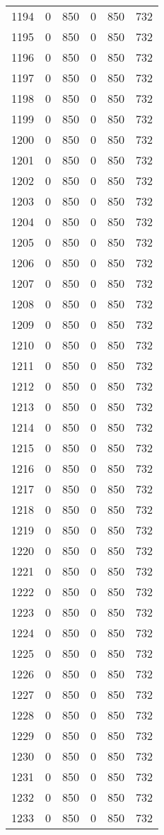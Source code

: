 \documentclass[a4paper]{ctexart}
\begin{document}
\begin{longtable}{p{1cm}|p{2cm}|p{2cm}|p{2cm}|P{2cm}|p{2cm}}
		1194&0&850&0&850&732\\
		1195&0&850&0&850&732\\
		1196&0&850&0&850&732\\
		1197&0&850&0&850&732\\
		1198&0&850&0&850&732\\
		1199&0&850&0&850&732\\
		1200&0&850&0&850&732\\
		1201&0&850&0&850&732\\
		1202&0&850&0&850&732\\
		1203&0&850&0&850&732\\
		1204&0&850&0&850&732\\
		1205&0&850&0&850&732\\
		1206&0&850&0&850&732\\
		1207&0&850&0&850&732\\
		1208&0&850&0&850&732\\
		1209&0&850&0&850&732\\
		1210&0&850&0&850&732\\
		1211&0&850&0&850&732\\
		1212&0&850&0&850&732\\
		1213&0&850&0&850&732\\
		1214&0&850&0&850&732\\
		1215&0&850&0&850&732\\
		1216&0&850&0&850&732\\
		1217&0&850&0&850&732\\
		1218&0&850&0&850&732\\
		1219&0&850&0&850&732\\
		1220&0&850&0&850&732\\
		1221&0&850&0&850&732\\
		1222&0&850&0&850&732\\
		1223&0&850&0&850&732\\
		1224&0&850&0&850&732\\
		1225&0&850&0&850&732\\
		1226&0&850&0&850&732\\
		1227&0&850&0&850&732\\
		1228&0&850&0&850&732\\
		1229&0&850&0&850&732\\
		1230&0&850&0&850&732\\
		1231&0&850&0&850&732\\
		1232&0&850&0&850&732\\
		1233&0&850&0&850&732\\

\end{longtable}
\end{document}
